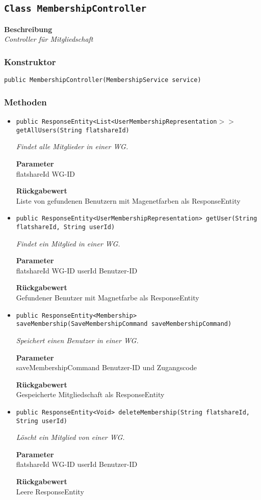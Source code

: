     \subsection{\texttt{Class MembershipController}}
    \textbf{Beschreibung} \\
    \textit{Controller für Mitgliedschaft}
    \subsubsection{Konstruktor}
    \texttt{public MembershipController(MembershipService service)}
    \subsubsection{Methoden}
    \begin{itemize}
    	\item{\texttt{public ResponseEntity<List<UserMembershipRepresentation$>>$ getAllUsers(String flatshareId)}}
    	
    	\textit{Findet alle Mitglieder in einer WG.}
    	
    	\textbf{Parameter} \\
    	flatshareId WG-ID
    	
    	\textbf{Rückgabewert} \\
    	Liste von gefundenen Benutzern mit Magenetfarben als ResponseEntity        \item{\texttt{public ResponseEntity<UserMembershipRepresentation> getUser(String flatshareId, String userId)}}
    	
    	\textit{Findet ein Mitglied in einer WG.}
    	
    	\textbf{Parameter} \\
    	flatshareId WG-ID
    	userId Benutzer-ID
    	
    	\textbf{Rückgabewert} \\
    	Gefundener Benutzer mit Magnetfarbe als ResponseEntity        \item{\texttt{public ResponseEntity<Membership> saveMembership(SaveMembershipCommand saveMembershipCommand)}}
    	
    	\textit{Speichert einen Benutzer in einer WG.}
    	
    	\textbf{Parameter} \\
    	saveMembershipCommand Benutzer-ID und Zugangscode
    	
    	\textbf{Rückgabewert} \\
    	Gespeicherte Mitgliedschaft als ResponseEntity        \item{\texttt{public ResponseEntity<Void> deleteMembership(String flatshareId, String userId)}}
    	
    	\textit{Löscht ein Mitglied von einer WG.}
    	
    	\textbf{Parameter} \\
    	flatshareId WG-ID
    	userId Benutzer-ID
    	
    	\textbf{Rückgabewert} \\
    	Leere ResponseEntity
    \end{itemize}
